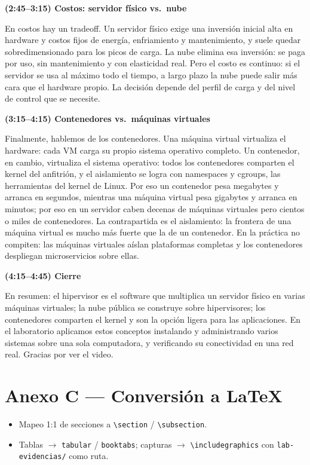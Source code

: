 \documentclass[11pt,a4paper]{report}
\begin{document}
\textbf{(2:45--3:15) Costos: servidor físico vs.\ nube}

En costos hay un tradeoff. Un servidor físico exige una inversión inicial alta en hardware y costos fijos de energía, enfriamiento y mantenimiento, y suele quedar sobredimensionado para los picos de carga. La nube elimina esa inversión: se paga por uso, sin mantenimiento y con elasticidad real. Pero el costo es continuo: si el servidor se usa al máximo todo el tiempo, a largo plazo la nube puede salir más cara que el hardware propio. La decisión depende del perfil de carga y del nivel de control que se necesite.

\textbf{(3:15--4:15) Contenedores vs.\ máquinas virtuales}

Finalmente, hablemos de los contenedores. Una máquina virtual virtualiza el hardware: cada VM carga su propio sistema operativo completo. Un contenedor, en cambio, virtualiza el sistema operativo: todos los contenedores comparten el kernel del anfitrión, y el aislamiento se logra con namespaces y cgroups, las herramientas del kernel de Linux. Por eso un contenedor pesa megabytes y arranca en segundos, mientras una máquina virtual pesa gigabytes y arranca en minutos; por eso en un servidor caben decenas de máquinas virtuales pero cientos o miles de contenedores. La contrapartida es el aislamiento: la frontera de una máquina virtual es mucho más fuerte que la de un contenedor. En la práctica no compiten: las máquinas virtuales aíslan plataformas completas y los contenedores despliegan microservicios sobre ellas.

\textbf{(4:15--4:45) Cierre}

En resumen: el hipervisor es el software que multiplica un servidor físico en varias máquinas virtuales; la nube pública se construye sobre hipervisores; los contenedores comparten el kernel y son la opción ligera para las aplicaciones. En el laboratorio aplicamos estos conceptos instalando y administrando varios sistemas sobre una sola computadora, y verificando su conectividad en una red real. Gracias por ver el video.

\section*{Anexo C --- Conversión a LaTeX}

\begin{itemize}
  \item Mapeo 1:1 de secciones a \texttt{\textbackslash section} / \texttt{\textbackslash subsection}.
  \item Tablas $\rightarrow$ \texttt{tabular} / \texttt{booktabs}; capturas $\rightarrow$ \texttt{\textbackslash includegraphics} con \texttt{lab-evidencias/} como ruta.
\end{itemize}
\end{document}

